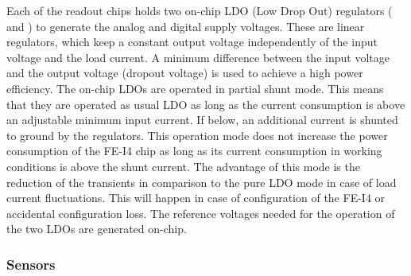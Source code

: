Each of the readout chips holds two on-chip LDO (Low Drop Out) regulators (\cite{Malte_44} and \cite{Malte_45}) to generate the analog and digital supply voltages. These are linear regulators, which keep a constant output voltage independently of the input voltage and the load current. A minimum difference between the input voltage and the output voltage (dropout voltage) is used to achieve a high power efficiency. The on-chip LDOs are operated in partial shunt mode. This means that they are operated as usual LDO as long as the current consumption is above an adjustable minimum input current. If below, an additional current is shunted to ground by the regulators. This operation mode does not increase the power consumption of the FE-I4 chip as long as its current consumption in working conditions is above the shunt current. The advantage of this mode is the reduction of the transients in comparison to the pure LDO mode in case of load current fluctuations. This will happen in case of configuration of the FE-I4 or accidental configuration loss. The reference voltages needed for the operation of the two LDOs are generated on-chip.

\subsubsection{Sensors}
\label{sec:mod_sensor}


